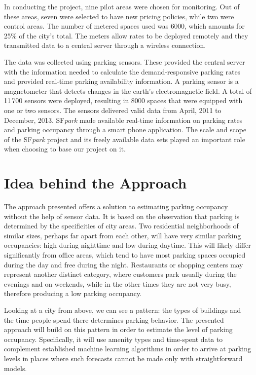 	In conducting the project, nine pilot areas were chosen for monitoring. Out of these areas, seven were selected to have new pricing policies, while two were control areas. The number of metered spaces used was 6000, which amounts for 25\% of the city's total. The meters allow rates to be deployed remotely and they transmitted data to a central server through a wireless connection.
	
	The data was collected using parking sensors. These provided the central server with the information needed to calculate the demand-responsive parking rates and provided real-time parking availability information. A parking sensor is a magnetometer that detects changes in the earth's electromagnetic field. A total of 11\,700 sensors were deployed, resulting in 8000 spaces that were equipped with one or two sensors. The sensors delivered valid data from April, 2011 to December, 2013. SF\textit{park} made available real-time information on parking rates and parking occupancy through a smart phone application. The scale and scope of the SF\textit{park} project and its freely available data sets played an important role when choosing to base our project on it.
	
	\section{Idea behind the Approach}
	The approach presented offers a solution to estimating parking occupancy without the help of sensor data. It is based on the observation that parking is determined by the specificities of city areas. Two residential neighborhoods of similar sizes, perhaps far apart from each other, will have very similar parking occupancies: high during nighttime and low during daytime. This will likely differ significantly from office areas, which tend to have most parking spaces occupied during the day and free during the night. Restaurants or shopping centers may represent another distinct category, where customers park usually during the evenings and on weekends, while in the other times they are not very busy, therefore producing a low parking occupancy.
	
	Looking at a city from above, we can see a pattern: the types of buildings and the time people spend there determines parking behavior. The presented approach will build on this pattern in order to estimate the level of parking occupancy. Specifically, it will use amenity types and time-spent data to complement established machine learning algorithms in order to arrive at parking levels in places where such forecasts cannot be made only with straightforward models.
	
